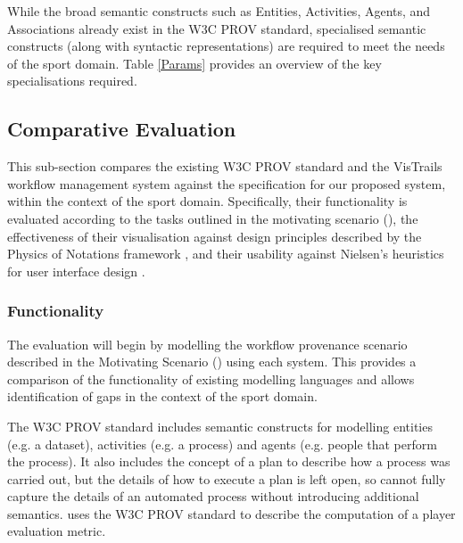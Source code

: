 While the broad semantic constructs such as Entities, Activities,
Agents, and Associations already exist in the W3C PROV standard, specialised semantic constructs
(along with syntactic representations) are required to meet the needs of the sport domain. Table
\ref{Params} provides an overview of the key specialisations required.


\subsection{Comparative Evaluation}
\label{sec:comparativeeval}

This sub-section compares the existing W3C PROV
standard and the VisTrails workflow management system
against the specification for our proposed system, within the context of the sport domain.
Specifically, their functionality is evaluated according to the tasks outlined in the motivating scenario (), the effectiveness of
their visualisation against design principles described by the Physics
of Notations framework \cite{Moody2009}, and their usability against Nielsen's heuristics
for user interface design \cite{Nielsen1994}.

\subsubsection{Functionality}
\label{sec:functionalityeval}

The evaluation will begin by modelling the workflow provenance scenario described in the Motivating Scenario () using each system. This provides a comparison of the functionality of existing modelling languages and allows identification of gaps in the context of the sport domain.

The W3C PROV standard includes semantic constructs for modelling
entities (e.g. a dataset), activities (e.g. a process) and agents (e.g.
people that perform the process). It also includes the concept of a plan
to describe how a process was carried out, but the details of how to
execute a plan is left open, so cannot fully capture the details of an
automated process without introducing additional semantics.  uses the
W3C PROV standard to describe the computation of a player evaluation
metric.

